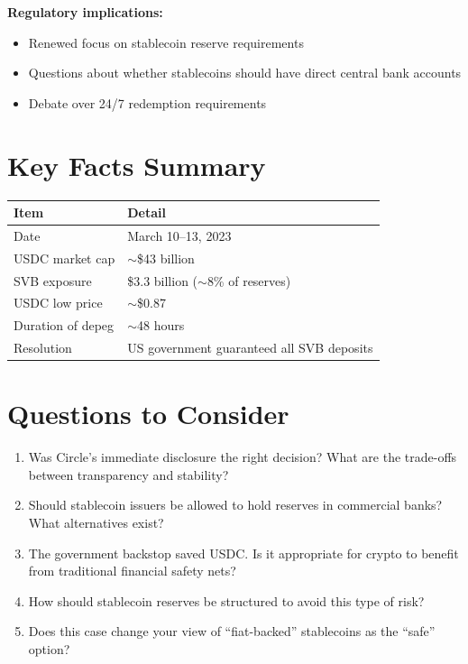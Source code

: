 \documentclass[11pt]{article}
\begin{document}
\medskip
\noindent\textbf{Regulatory implications:}
\begin{itemize}[leftmargin=*]
\item Renewed focus on stablecoin reserve requirements
\item Questions about whether stablecoins should have direct central bank accounts
\item Debate over 24/7 redemption requirements
\end{itemize}

\section*{Key Facts Summary}

\begin{center}
\begin{tabular}{ll}
\toprule
\textbf{Item} & \textbf{Detail} \\
\midrule
Date & March 10--13, 2023 \\
USDC market cap & $\sim$\$43 billion \\
SVB exposure & \$3.3 billion ($\sim$8\% of reserves) \\
USDC low price & $\sim$\$0.87 \\
Duration of depeg & $\sim$48 hours \\
Resolution & US government guaranteed all SVB deposits \\
\bottomrule
\end{tabular}
\end{center}

\section*{Questions to Consider}

\begin{enumerate}[leftmargin=*]
\item Was Circle's immediate disclosure the right decision? What are the trade-offs between transparency and stability?

\item Should stablecoin issuers be allowed to hold reserves in commercial banks? What alternatives exist?

\item The government backstop saved USDC. Is it appropriate for crypto to benefit from traditional financial safety nets?

\item How should stablecoin reserves be structured to avoid this type of risk?

\item Does this case change your view of ``fiat-backed'' stablecoins as the ``safe'' option?
\end{enumerate}
\end{document}
